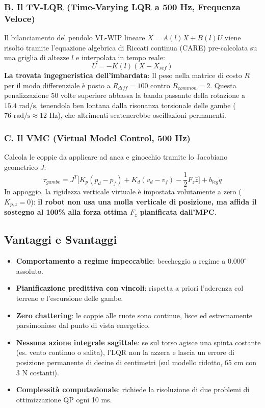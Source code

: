 \documentclass[11pt,a4paper]{article}
\begin{document}
\subsubsection{B. Il TV-LQR (Time-Varying LQR a 500 Hz, Frequenza Veloce)}
Il bilanciamento del pendolo VL-WIP lineare $\dot{X} = A(l)X + B(l)U$ viene risolto tramite l'equazione algebrica di Riccati continua (CARE) pre-calcolata su una griglia di altezze $l$ e interpolata in tempo reale:
\begin{equation}
U = -K(l)(X - X_{ref})
\end{equation}
\textbf{La trovata ingegneristica dell'imbardata}: Il peso nella matrice di costo $R$ per il modo differenziale è posto a $R_{diff} = 100$ contro $R_{common} = 2$. Questa penalizzazione 50 volte superiore abbassa la banda passante della rotazione a $15.4\text{ rad/s}$, tenendola ben lontana dalla risonanza torsionale delle gambe ($76\text{ rad/s} \approx 12\text{ Hz}$), che altrimenti scatenerebbe oscillazioni permanenti.

\subsubsection{C. Il VMC (Virtual Model Control, 500 Hz)}
Calcola le coppie da applicare ad anca e ginocchio tramite lo Jacobiano geometrico $J$:
\begin{equation}
\tau_{gambe} = J^T \Big[ K_p (p_d - p_f) + K_d (v_d - v_f) - \frac{1}{2}F_z \hat{z} \Big] + b_{leg}\dot{q}
\end{equation}
In appoggio, la rigidezza verticale virtuale è impostata volutamente a zero ($K_{p,z} = 0$): \textbf{il robot non usa una molla verticale di posizione, ma affida il sostegno al 100\% alla forza ottima $F_z$ pianificata dall'MPC}.

\subsection{Vantaggi e Svantaggi}
\begin{itemize}
    \item[\textcolor{green}{\textbf{+}}] \textbf{Comportamento a regime impeccabile}: beccheggio a regime a $0.000^\circ$ assoluto.
    \item[\textcolor{green}{\textbf{+}}] \textbf{Pianificazione predittiva con vincoli}: rispetta a priori l'aderenza col terreno e l'escursione delle gambe.
    \item[\textcolor{green}{\textbf{+}}] \textbf{Zero chattering}: le coppie alle ruote sono continue, lisce ed estremamente parsimoniose dal punto di vista energetico.
    \item[\textcolor{red}{\textbf{--}}] \textbf{Nessuna azione integrale sagittale}: se sul torso agisce una spinta costante (es. vento continuo o salita), l'LQR non la azzera e lascia un errore di posizione permanente di decine di centimetri (sul modello ridotto, 65 cm con 3 N costanti).
    \item[\textcolor{red}{\textbf{--}}] \textbf{Complessità computazionale}: richiede la risoluzione di due problemi di ottimizzazione QP ogni 10 ms.
\end{itemize}
\end{document}
